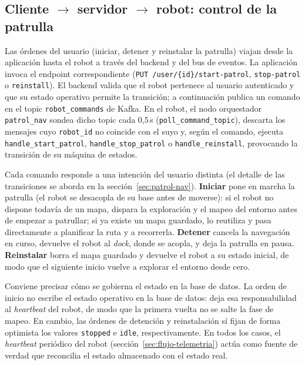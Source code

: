 \subsection{Cliente \texorpdfstring{$\rightarrow$}{->} servidor
  \texorpdfstring{$\rightarrow$}{->} robot: control de la patrulla}
\label{sec:flujo-control}

Las órdenes del usuario (iniciar, detener y reinstalar la patrulla) viajan desde
la aplicación hasta el robot a través del backend y del bus de eventos. La
aplicación invoca el endpoint correspondiente
(\texttt{PUT /user/\{id\}/start-patrol}, \texttt{stop-patrol} o \texttt{reinstall}).
El backend valida que el robot pertenece al usuario autenticado y que su estado
operativo permite la transición; a continuación publica un comando en el topic
\texttt{robot\_commands} de Kafka. En el robot, el nodo orquestador
\texttt{patrol\_nav} sondea dicho topic cada 0,5\,s
(\texttt{poll\_command\_topic}), descarta los mensajes cuyo \texttt{robot\_id} no
coincide con el suyo y, según el comando, ejecuta \texttt{handle\_start\_patrol},
\texttt{handle\_stop\_patrol} o \texttt{handle\_reinstall}, provocando la
transición de su máquina de estados.

Cada comando responde a una intención del usuario distinta (el detalle de las
transiciones se aborda en la sección~\ref{sec:patrol-nav}). \textbf{Iniciar} pone
en marcha la patrulla (el robot se desacopla de su base antes de moverse): si el robot
no dispone todavía de un mapa, dispara la
exploración y el mapeo del entorno antes de empezar a patrullar; si ya existe un
mapa guardado, lo reutiliza y pasa directamente a planificar la ruta y a recorrerla.
\textbf{Detener} cancela la navegación en curso, devuelve el robot al \textit{dock},
donde se acopla, y deja la patrulla en pausa. \textbf{Reinstalar} borra el mapa guardado y devuelve
el robot a su estado inicial, de modo que el siguiente inicio vuelve a explorar el
entorno desde cero.

Conviene precisar cómo se gobierna el estado en la base de datos. La orden de
inicio no escribe el estado operativo en la base de datos: deja esa
responsabilidad al \textit{heartbeat} del robot, de modo que la primera vuelta no
se salte la fase de mapeo. En cambio, las órdenes de detención y reinstalación sí
fijan de forma optimista los valores \texttt{stopped} e \texttt{idle},
respectivamente. En todos los casos, el \textit{heartbeat} periódico del robot
(sección~\ref{sec:flujo-telemetria}) actúa como fuente de verdad que reconcilia el
estado almacenado con el estado real.

